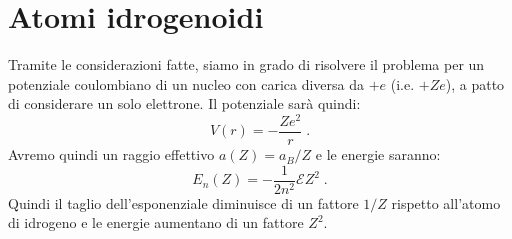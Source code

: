 \documentclass[12pt,a4paper]{report}
\theoremstyle{definition}
\numberwithin{equation}{section}
\begin{document}
\section{Atomi idrogenoidi}
Tramite le considerazioni fatte, siamo in grado di risolvere il problema per un potenziale coulombiano di un nucleo con carica diversa da $+e$ (i.e. $+Ze$), a patto di considerare un solo elettrone. Il potenziale sarà quindi:
\begin{equation}
V(r)=-\frac{Ze^2}{r}\;.
\end{equation}
Avremo quindi un raggio effettivo $a(Z)=a_B/Z$ e le energie saranno:
\begin{equation}
E_n(Z)=-\frac{1}{2n^2}\mathcal{E}Z^2\;.
\end{equation}
Quindi il taglio dell'esponenziale diminuisce di un fattore $1/Z$ rispetto all'atomo di idrogeno e le energie aumentano di un fattore $Z^2$.
\end{document}
